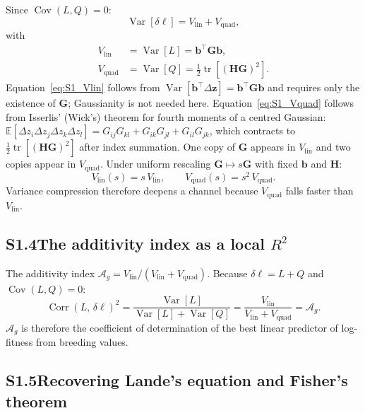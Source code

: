 \documentclass[11pt]{article}
\newcommand{\vect}[1]{\boldsymbol{#1}}
\newcommand{\mat}[1]{\mathbf{#1}}
\newcommand{\Ag}{\mathcal{A}_{g}}
\newcommand{\Vlin}{V_{\mathrm{lin}}}
\newcommand{\Vquad}{V_{\mathrm{quad}}}
\newcommand{\tr}{\operatorname{tr}}
\newcommand{\Var}{\operatorname{Var}}
\newcommand{\Cov}{\operatorname{Cov}}
\newcommand{\Corr}{\operatorname{Corr}}
\begin{document}
Since $\Cov(L,Q) = 0$:
\begin{equation}
\Var[\delta\ell] = \Vlin + \Vquad,
\label{eq:S1_decomp}
\end{equation}
with
\begin{align}
\Vlin &= \Var[L] = \vect{b}^\top\mat{G}\vect{b},
\label{eq:S1_Vlin} \\[4pt]
\Vquad &= \Var[Q] = \tfrac{1}{2}\tr[(\mat{H}\mat{G})^2].
\label{eq:S1_Vquad}
\end{align}
Equation~\eqref{eq:S1_Vlin} follows from
$\Var[\vect{b}^\top\Delta\vect{z}]
= \vect{b}^\top\mat{G}\vect{b}$ and requires only the existence of
$\mat{G}$; Gaussianity is not needed here.
Equation~\eqref{eq:S1_Vquad} follows from Isserlis' (Wick's)
theorem for fourth moments of a centred Gaussian:
$\mathbb{E}[\Delta z_i\Delta z_j\Delta z_k\Delta z_l]
= G_{ij}G_{kl} + G_{ik}G_{jl} + G_{il}G_{jk}$,
which contracts to $\tfrac{1}{2}\tr[(\mat{H}\mat{G})^2]$ after
index summation.
One copy of $\mat{G}$ appears in $\Vlin$ and two copies appear in
$\Vquad$.
Under uniform rescaling $\mat{G}\mapsto s\mat{G}$ with fixed
$\vect{b}$ and $\mat{H}$:
\begin{equation}
\Vlin(s) = s\,\Vlin, \qquad \Vquad(s) = s^2\,\Vquad.
\label{eq:S1_scaling}
\end{equation}
Variance compression therefore deepens a channel because
$\Vquad$ falls faster than $\Vlin$.

\subsection*{S1.4\quad The additivity index as a local $R^2$}

The additivity index $\Ag = \Vlin/(\Vlin+\Vquad)$.
Because $\delta\ell = L + Q$ and $\Cov(L,Q) = 0$:
\begin{equation}
\Corr(L,\,\delta\ell)^2
= \frac{\Var[L]}{\Var[L]+\Var[Q]}
= \frac{\Vlin}{\Vlin+\Vquad}
= \Ag.
\label{eq:S1_R2}
\end{equation}
$\Ag$ is therefore the coefficient of determination of the best
linear predictor of log-fitness from breeding values.

\subsection*{S1.5\quad Recovering Lande's equation and Fisher's
             theorem}
\end{document}
